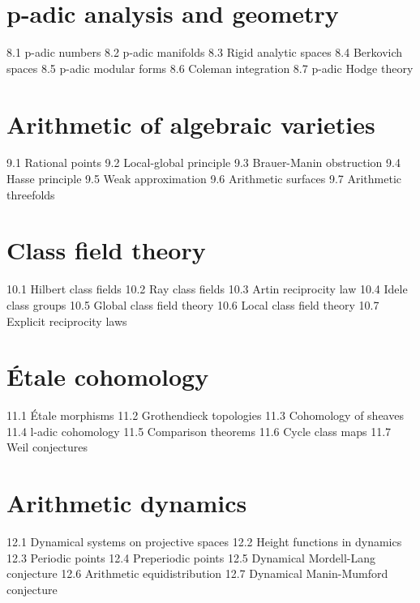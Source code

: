 \section{p-adic analysis and geometry}
8.1 p-adic numbers
8.2 p-adic manifolds
8.3 Rigid analytic spaces
8.4 Berkovich spaces
8.5 p-adic modular forms
8.6 Coleman integration
8.7 p-adic Hodge theory
\section{Arithmetic of algebraic varieties}
9.1 Rational points
9.2 Local-global principle
9.3 Brauer-Manin obstruction
9.4 Hasse principle
9.5 Weak approximation
9.6 Arithmetic surfaces
9.7 Arithmetic threefolds
\section{Class field theory}
10.1 Hilbert class fields
10.2 Ray class fields
10.3 Artin reciprocity law
10.4 Idele class groups
10.5 Global class field theory
10.6 Local class field theory
10.7 Explicit reciprocity laws
\section{Étale cohomology}
11.1 Étale morphisms
11.2 Grothendieck topologies
11.3 Cohomology of sheaves
11.4 l-adic cohomology
11.5 Comparison theorems
11.6 Cycle class maps
11.7 Weil conjectures
\section{Arithmetic dynamics}
12.1 Dynamical systems on projective spaces
12.2 Height functions in dynamics
12.3 Periodic points
12.4 Preperiodic points
12.5 Dynamical Mordell-Lang conjecture
12.6 Arithmetic equidistribution
12.7 Dynamical Manin-Mumford conjecture
